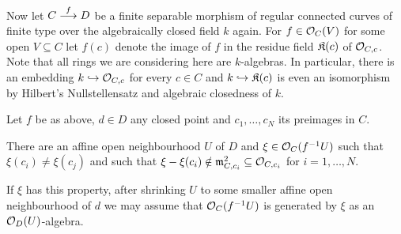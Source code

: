 \documentclass[a4paper,parskip=half,numbers=enddot, DIV=12]{scrreprt}
\begin{document}
Now let $C\morphism[f]D$ be a finite separable morphism of regular connected curves of finite type over the algebraically closed field $k$ again. For $f\in\mathcal{O}_C(V)$ for some open $V\subseteq C$ let $f(c)$ denote the image of $f$ in the residue field $\mathfrak{K}(c)$ of $\mathcal{O}_{C,c}$. Note that all rings we are considering here are $k$-algebras. In particular, there is an embedding $k\monomorphism\Oo_{C,c}$ for every $c\in C$ and $k\monomorphism\KK(c)$ is even an isomorphism by Hilbert's Nullstellensatz and algebraic closedness of $k$.
\begin{lem}
	Let $f$ be as above, $d\in D$ any closed point and $c_1,\ldots,c_N$ its preimages in $C$.
	\begin{alphanumerate}
		\item There are an affine open neighbourhood $U$ of $D$ and $\xi\in\mathcal{O}_C(f^{-1}U)$ such that $\xi(c_i)\neq\xi(c_j)$ and such that $\xi-\xi(c_i)\notin\mathfrak{m}_{C,c_i}^2\subseteq\mathcal{O}_{C,c_i}$ for $i=1,\ldots,N$.
		\item If $\xi$ has this property, after shrinking $U$ to some smaller affine open neighbourhood of $d$ we may assume that $\mathcal{O}_C(f^{-1}U)$ is generated by $\xi$ as an $\mathcal{O}_D(U)$-algebra.
	\end{alphanumerate}
\end{lem}
\end{document}
